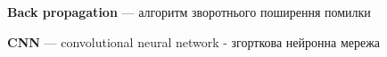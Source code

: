 \shortings

\textbf{Back propagation} --- алгоритм зворотнього поширення помилки  

\textbf{CNN} --- convolutional neural network - згорткова нейронна мережа